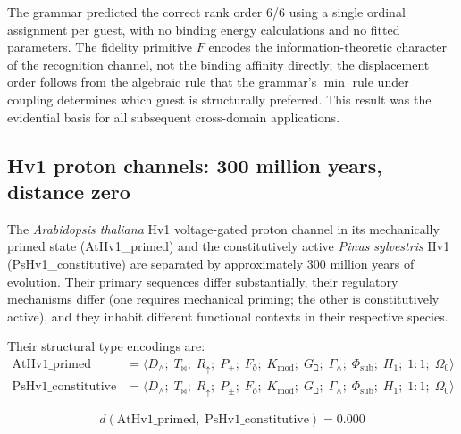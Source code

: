 \documentclass[12pt,a4paper]{article}
\newcommand{\Ppm}{P_{\pm}}
\newcommand{\Tbw}{T_{\mathord{\bowtie}}}
\begin{document}
\noindent
The grammar predicted the correct rank order 6/6 using a single
ordinal assignment per guest, with no binding energy calculations and
no fitted parameters. The fidelity primitive $F$ encodes the
information-theoretic character of the recognition channel, not the
binding affinity directly; the displacement order follows from the
algebraic rule that the grammar's $\min$ rule under coupling determines
which guest is structurally preferred. This result was the evidential
basis for all subsequent cross-domain applications.

\subsection{Hv1 proton channels: 300 million years, distance zero}
\label{sec:hv1}

The \emph{Arabidopsis thaliana} Hv1 voltage-gated proton channel in
its mechanically primed state (AtHv1\_primed) and the constitutively
active \emph{Pinus sylvestris} Hv1 (PsHv1\_constitutive) are separated
by approximately 300 million years of evolution. Their primary sequences
differ substantially, their regulatory mechanisms differ (one requires
mechanical priming; the other is constitutively active), and they
inhabit different functional contexts in their respective species.

Their structural type encodings are:
\begin{align}
  \text{AtHv1\_primed} &= \langle D_\wedge;\; \Tbw;\; R_\uparrow;\;
    \Ppm;\; F_\eth;\; K_\text{mod};\; G_\beth;\; \Gamma_\wedge;\;
    \Phi_\text{sub};\; H_1;\; 1{:}1;\; \Omega_0 \rangle \\
  \text{PsHv1\_constitutive} &= \langle D_\wedge;\; \Tbw;\; R_\uparrow;\;
    \Ppm;\; F_\eth;\; K_\text{mod};\; G_\beth;\; \Gamma_\wedge;\;
    \Phi_\text{sub};\; H_1;\; 1{:}1;\; \Omega_0 \rangle
\end{align}

\begin{equation}
  d(\text{AtHv1\_primed},\; \text{PsHv1\_constitutive}) = 0.000
  \label{eq:hv1}
\end{equation}
\end{document}
